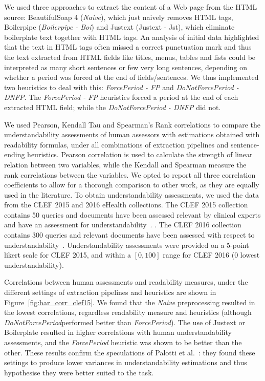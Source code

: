 We used three approaches to extract the content of a Web page from the HTML source: BeautifulSoap 4 (\textit{Naive}), which just naively removes HTML tags, Boilerpipe\cite{kohlschutter10} (\textit{Boilerpipe - Boi}) and Justext\cite{jan11} ({Justext - Jst}), which eliminate boilerplate text together with HTML tags. An analysis of initial data highlighted that the text in HTML tags often missed a correct punctuation mark and thus the text extracted from HTML fields like titles, menus, tables and lists could be interpreted as many short sentences or few very long sentences, depending on whether a period was forced at the end of fields/sentences. We thus implemented two heuristics to deal with this: \textit{ForcePeriod - FP} and \textit{DoNotForcePeriod - DNFP}. The \textit{ForcePeriod - FP} heuristics forced a period at the end of each extracted HTML field; while the \textit{DoNotForcePeriod - DNFP} did not. 

We used Pearson, Kendall Tau and Spearman's Rank correlations to compare the understandability assessments of human assessors with estimations obtained with readability formulas, under all combinations of extraction pipelines and sentence-ending heuristics. Pearson correlation is used to calculate the strength of linear relation between two variables, while the Kendall and Spearman measure the rank correlations between the variables. We opted to report all three correlation coefficients to allow for a thorough comparison to other work, as they are equally used in the literature. To obtain understandability assessments, we used the data from the CLEF 2015 and 2016 eHealth collections. The CLEF 2015 collection contains 50 queries and  documents have been assessed relevant by clinical experts and have an assessment for understandability~\cite{}. . The CLEF 2016 collection contains 300 queries and  relevant documents have been assessed with respect to understandability~\cite{}. Understandability assessments were provided on a 5-point likert scale for CLEF 2015, and within a $[0,100]$ range for CLEF 2016 (0 lowest understandability). 

Correlations between human assessments and readability measures, under the different settings of extraction pipelines and heuristics are shown in Figure~\ref{fig:bar_corr_clef15}. We found that the \textit{Naive} preprocessing resulted in the lowest correlations, regardless readability measure and heuristics (although \textit{DoNotForcePeriod}performed better than \textit{ForcePeriod}). The use of Justext or Boilerplate resulted in higher correlations with human understandability assessments, and the \textit{ForcePeriod} heuristic was shown to be better than the other. These results confirm the speculations of Palotti et al.~\cite{palotti15}: they found these settings to produce lower variances in understandability estimations and thus hypothesise they were better suited to the task.

